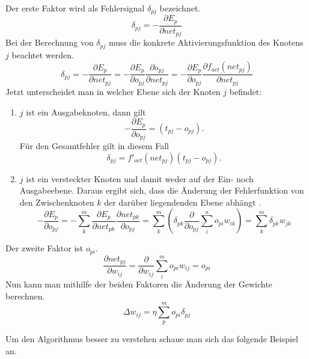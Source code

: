 \documentclass[12pt]{article}
\begin{document}
Der erste Faktor wird als Fehlersignal $\delta_{pj}$ bezeichnet.
\begin{equation}
\delta_{pj}=-\frac{\partial E_p}{\partial net_{pj}}
\end{equation}
Bei der Berechnung von $\delta_{pj}$ muss die konkrete Aktivierungsfunktion des Knotens $j$ beachtet werden.
\begin{equation}
\delta_{pj}=-\frac{\partial E_p}{\partial net_{pj}}=-\frac{\partial E_p}{\partial o_{pj}}\frac{\partial o_{pj}}{\partial net_{pj}}=-\frac{\partial E_p}{\partial o_{pj}}\frac{\partial f_{act}(net_{pj})}{\partial net_{pj}}
\end{equation}
Jetzt unterscheidet man in welcher Ebene sich der Knoten $j$ befindet:
\begin{enumerate}
	\item $j$ ist ein Ausgabeknoten, dann gilt
\begin{equation}-\frac{\partial E_p}{\partial o_{pj}}=(t_{pj}-o_{pj}).\end{equation}
	Für den Gesamtfehler gilt in diesem Fall
\begin{equation}\delta_{pj}=f'_{act}(net_{pj})(t_{pj}-o_{pj}).\end{equation}
	\item $j$ ist ein versteckter Knoten und damit weder auf der Ein- noch Ausgabeebene. Daraus ergibt sich, dass die Änderung der Fehlerfunktion von den Zwischenknoten $k$ der darüber liegendenden Ebene abhängt \cite{PDP}.
\begin{equation}-\frac{\partial E_p}{\partial o_{pj}}=-\sum_k^m\frac{\partial E_p}{\partial net_{pk}}\frac{\partial net_{pk}}{\partial o_{pj}}=\sum_k^m\left(\delta_{pk}\frac{\partial}{\partial o_{pj}}\sum_i^n o_{pi}w_{ik}\right)=\sum_k^m \delta_{pk}w_{jk}\end{equation}
\end{enumerate}
Der zweite Faktor ist $o_{pi}$.
\begin{equation}\frac{\partial net_{pj}}{\partial w_{ij}}=\frac{\partial}{\partial w_{ij}}\sum_i^m o_{pi}w_{ij}=o_{pi}\end{equation}
Nun kann man mithilfe der beiden Faktoren die Änderung der Gewichte berechnen.
\begin{equation}\Delta w_{ij}=\eta\sum_p^mo_{pi}\delta_{pj}\end{equation}


Um den Algorithmus besser zu verstehen schaue man sich das folgende Beispiel an.
\end{document}
